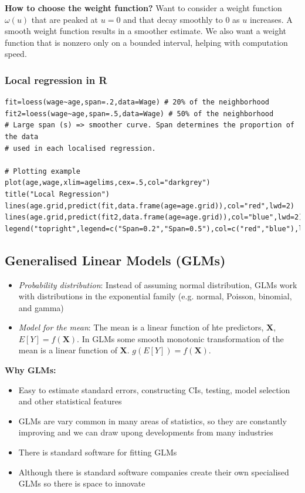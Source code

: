 \documentclass[11pt]{article}
\begin{document}
\noindent \textbf{How to choose the weight function?} Want to consider a weight function $\omega(u)$ that are peaked at $u=0$ and that decay smoothly to $0$ as $u$ increases. A smooth weight function results in a smoother estimate. We also want a weight function that is nonzero only on a bounded interval, helping with computation speed.

\subsubsection{Local regression in R}
\begin{lstlisting}
fit=loess(wage~age,span=.2,data=Wage) # 20% of the neighborhood
fit2=loess(wage~age,span=.5,data=Wage) # 50% of the neighborhood
# Large span (s) => smoother curve. Span determines the proportion of the data
# used in each localised regression.

# Plotting example 
plot(age,wage,xlim=agelims,cex=.5,col="darkgrey")
title("Local Regression")
lines(age.grid,predict(fit,data.frame(age=age.grid)),col="red",lwd=2)
lines(age.grid,predict(fit2,data.frame(age=age.grid)),col="blue",lwd=2)
legend("topright",legend=c("Span=0.2","Span=0.5"),col=c("red","blue"),lty=1,lwd=2,cex=.8)
\end{lstlisting}

\subsection{Generalised Linear Models (GLMs)}
\begin{itemize}
    \item \textit{Probability distribution}: Instead of assuming normal distribution, GLMs work with distributions in the exponential family (e.g. normal, Poisson, binomial, and gamma)
    \item \textit{Model for the mean}: The mean is a linear function of hte predictors, $\boldsymbol{X}$, $E[Y] = f(\boldsymbol{X})$. In GLMs some smooth monotonic transformation of the mean is a linear function of $\boldsymbol{X}$. $g(E[Y]) = f(\boldsymbol{X})$.
\end{itemize} \phantom{i}

\noindent \textbf{Why GLMs:}
\begin{itemize}
    \item Easy to estimate standard errors, constructing CIs, testing, model selection and other statistical features
    \item GLMs are vary common in many areas of statistics, so they are constantly improving and we can draw upong developments from many industries
    \item There is standard software for fitting GLMs
    \item Although there is standard software companies create their own specialised GLMs so there is space to innovate
\end{itemize} \phantom{i}
\end{document}
